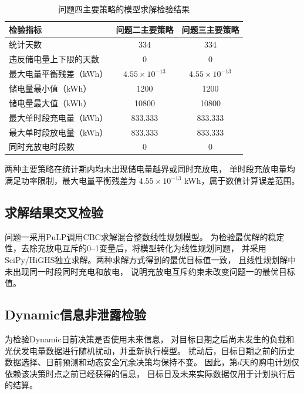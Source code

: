 \begin{table}[H]
\centering
\caption{问题四主要策略的模型求解检验结果}
\label{tab:p4_numerical_check}
\begin{tabular}{lcc}
\toprule
检验指标 & 问题二主要策略 & 问题三主要策略 \\
\midrule
统计天数 & 334 & 334 \\
违反储电量上下限的天数 & 0 & 0 \\
最大电量平衡残差（kWh） & $4.55\times10^{-13}$ & $4.55\times10^{-13}$ \\
储电量最小值（kWh） & 1200 & 1200 \\
储电量最大值（kWh） & 10800 & 10800 \\
最大单时段充电量（kWh） & 833.333 & 833.333 \\
最大单时段放电量（kWh） & 833.333 & 833.333 \\
同时充放电时段数 & 0 & 0 \\
\bottomrule
\end{tabular}
\end{table}

两种主要策略在统计期内均未出现储电量越界或同时充放电，
单时段充放电量均满足功率限制，最大电量平衡残差为
$4.55\times10^{-13}$ kWh，属于数值计算误差范围。


\subsection{求解结果交叉检验}

问题一采用PuLP调用CBC求解混合整数线性规划模型。
为检验最优解的稳定性，去除充放电互斥的0--1变量后，将模型转化为线性规划问题，
并采用SciPy/HiGHS独立求解。两种求解方式得到的最优目标值一致，
且线性规划解中未出现同一时段同时充电和放电，
说明充放电互斥约束未改变问题一的最优目标值。


\subsection{Dynamic信息非泄露检验}

为检验Dynamic日前决策是否使用未来信息，
对目标日期之后尚未发生的负载和光伏发电量数据进行随机扰动，并重新执行模型。
扰动后，目标日期之前的历史数据选择、日前预测和动态安全冗余决策均保持不变。
因此，第$d$天的购电计划仅依赖该决策时点之前已经获得的信息，
目标日及未来实际数据仅用于计划执行后的结算。